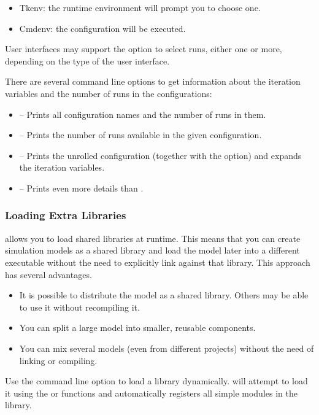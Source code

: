 \begin{itemize}
  \item Tkenv: the runtime environment will prompt you to choose one.
  \item Cmdenv: the  configuration will be executed.
\end{itemize}

User interfaces may support the  option to select runs,
either one or more, depending on the type of the user interface.

There are several command line options to get information about the iteration
variables and the number of runs in the configurations:

\begin{itemize}
  \item {} -- Prints all configuration names and the number of runs in them.
  \item {} -- Prints the number of runs available in the given configuration.
  \item {} -- Prints the unrolled configuration (together with the  option) and
                    expands the iteration variables.
  \item {} -- Prints even more details than .
\end{itemize}


\subsubsection{Loading Extra Libraries}
\label{sec:run-sim:loading-extra-libraries}

{\opp} allows you to load shared libraries at runtime. This means that you can create
simulation models as a shared library and load the model later into a different executable without
the need to explicitly link against that library. This approach has several advantages.

\begin{itemize}
  \item It is possible to distribute the model as a shared library. Others may be able to use
  it without recompiling it.
  \item You can split a large model into smaller, reusable components.
  \item You can mix several models (even from different projects)
    without the need of linking or compiling.
\end{itemize}

Use the  command line option to load a library dynamically.
{\opp} will attempt to load it using the  or  functions and
automatically registers all simple modules in the library.

